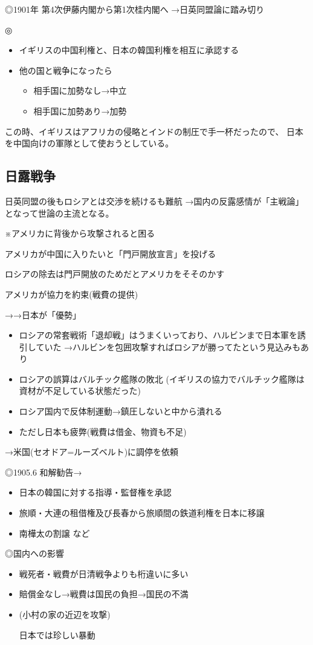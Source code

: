 \documentclass[12pt,fleqn]{ltjsarticle}
\begin{document}
◎1901年 第4次伊藤内閣から第1次桂内閣へ
→日英同盟論に踏み切り

◎
\begin{itemize}
    \item イギリスの中国利権と、日本の韓国利権を相互に承認する
    \item 他の国と戦争になったら
        \begin{itemize}
            \item 相手国に加勢なし→中立
            \item 相手国に加勢あり→加勢
        \end{itemize}
\end{itemize}

この時、イギリスはアフリカの侵略とインドの制圧で手一杯だったので、
日本を中国向けの軍隊として使おうとしている。

\subsection{日露戦争}
日英同盟の後もロシアとは交渉を続けるも難航
→国内の反露感情が「主戦論」となって世論の主流となる。

※アメリカに背後から攻撃されると困る
\begin{description}
    \item アメリカが中国に入りたいと「門戸開放宣言」を投げる
    \item ロシアの除去は門戸開放のためだとアメリカをそそのかす
    \item アメリカが協力を約束(戦費の提供)
\end{description}

→→日本が「優勢」
\begin{itemize}
    \item ロシアの常套戦術「退却戦」はうまくいっており、ハルビンまで日本軍を誘引していた
        →ハルビンを包囲攻撃すればロシアが勝ってたという見込みもあり
    \item ロシアの誤算はバルチック艦隊の敗北
        (イギリスの協力でバルチック艦隊は資材が不足している状態だった)
    \item ロシア国内で反体制運動→鎮圧しないと中から潰れる
    \item ただし日本も疲弊(戦費は借金、物資も不足)
\end{itemize}
→米国(セオドア=ルーズベルト)に調停を依頼

◎1905.6 和解勧告→
\begin{itemize}
    \item 日本の韓国に対する指導・監督権を承認
    \item 旅順・大連の租借権及び長春から旅順間の鉄道利権を日本に移譲
    \item 南樺太の割譲
        など
\end{itemize}

◎国内への影響
\begin{itemize}
    \item 戦死者・戦費が日清戦争よりも桁違いに多い
    \item 賠償金なし→戦費は国民の負担→国民の不満
    \item {}(小村の家の近辺を攻撃)

        日本では珍しい暴動
\end{itemize}
\end{document}
